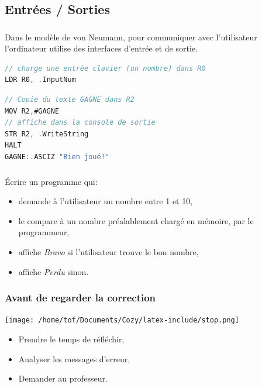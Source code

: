 \documentclass[svgnames,11pt]{beamer}
\begin{document}
\subsection{Entrées / Sorties}
\begin{frame}[fragile]
    \frametitle{}

    Dans le modèle de von Neumann, pour communiquer avec l'utilisateur l'ordinateur utilise des interfaces d'entrée et de sortie.
    \begin{center}
    \begin{lstlisting}[language=C , basicstyle=\small, xleftmargin=2em, xrightmargin=2em]
// charge une entrée clavier (un nombre) dans R0
LDR R0, .InputNum
\end{lstlisting}
    \label{CODE}
    \end{center}
    \begin{center}
        \begin{lstlisting}[language=C , basicstyle=\small, xleftmargin=2em, xrightmargin=2em]
// Copie du texte GAGNE dans R2
MOV R2,#GAGNE       
// affiche dans la console de sortie
STR R2, .WriteString
HALT
GAGNE:.ASCIZ "Bien joué!"
\end{lstlisting}
        \label{CODE}
        \end{center}
\end{frame}
\begin{frame}
    \frametitle{}

    \begin{activite}
    Écrire un programme qui:
    \begin{itemize}
        \item demande à l'utilisateur un nombre entre 1 et 10,
        \item le compare à un nombre préalablement chargé en mémoire, par le programmeur,
        \item affiche \emph{Bravo} si l'utilisateur trouve le bon nombre,
        \item affiche \emph{Perdu} sinon.
    \end{itemize}
    \end{activite}

\end{frame}
\begin{frame}
    \frametitle{Avant de regarder la correction}
\begin{center}
    \centering
    \texttt{[image: /home/tof/Documents/Cozy/latex-include/stop.png]}
    \end{center}
{\Large
    \begin{itemize}
        \item Prendre le temps de réfléchir,
        \item Analyser les messages d'erreur,
        \item Demander au professeur.
    \end{itemize}
}
\end{frame}
\end{document}
